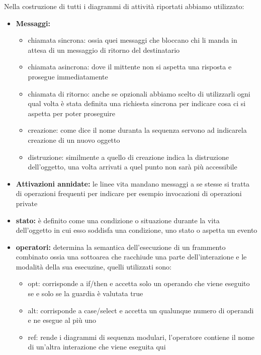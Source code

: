 \documentclass[a4paper, 11pt,oneside]{book}
\newcommand{\spacing}{\par\bigskip\noindent}
\begin{document}
        \spacing
        Nella costruzione di tutti i diagrammi di attività riportati abbiamo utilizzato:
        \begin{itemize}
            \item \textbf{Messaggi:}
            \begin{itemize}
                \item chiamata sincrona: ossia quei messaggi che bloccano chi li manda in attesa di un messaggio di ritorno del destinatario
                \item chiamata asincrona: dove il mittente non si aspetta una risposta e prosegue immediatamente
                \item chiamata di ritorno: anche se opzionali abbiamo scelto di utilizzarli ogni qual volta è stata definita una richiesta sincrona per indicare
                cosa ci si aspetta per poter proseguire
                \item creazione: come dice il nome duranta la sequenza servono ad indicarela creazione di un nuovo oggetto
                \item distruzione: similmente a quello di creazione indica la distruzione dell'oggetto, una volta arrivati a quel punto non sarà più accessibile
            \end{itemize}
            \item \textbf{Attivazioni annidate:} le linee vita mandano messaggi a se stesse si tratta di operazioni frequenti per indicare per esempio invocazioni di operazioni private
            \item \textbf{stato:} è definito come una condizione o situazione durante la vita dell'oggetto in cui esso soddisfa una condizione, uno stato o aspetta un evento
            \item \textbf{operatori:} determina la semantica dell'esecuzione di un frammento combinato ossia una sottoarea che racchiude una parte dell'interazione e le modalità della sua esecuzine, quelli utilizzati sono:
            \begin{itemize}
                \item opt: corrisponde a if/then e accetta solo un operando che viene eseguito se e solo se la guardia è valutata true
                \item alt: corrisponde a case/select e accetta un qualunque numero di operandi e ne esegue al più uno
                \item ref: rende i diagrammi di sequenza modulari, l'operatore contiene il nome di un'altra interazione che viene eseguita qui
            \end{itemize}
        \end{itemize}
\end{document}
